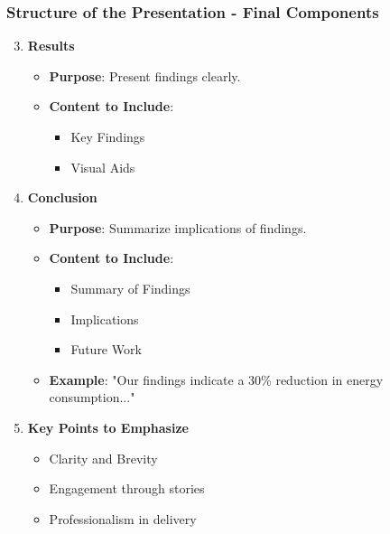 \documentclass[aspectratio=169]{beamer}
\begin{document}
\begin{frame}[fragile]
    \frametitle{Structure of the Presentation - Final Components}
    \begin{enumerate}
        \setcounter{enumi}{2}
        \item \textbf{Results}
            \begin{itemize}
                \item \textbf{Purpose}: Present findings clearly.
                \item \textbf{Content to Include}:
                    \begin{itemize}
                        \item Key Findings
                        \item Visual Aids
                    \end{itemize}
            \end{itemize}

        \item \textbf{Conclusion}
            \begin{itemize}
                \item \textbf{Purpose}: Summarize implications of findings.
                \item \textbf{Content to Include}:
                    \begin{itemize}
                        \item Summary of Findings
                        \item Implications
                        \item Future Work
                    \end{itemize}
                \item \textbf{Example}: "Our findings indicate a 30\% reduction in energy consumption..."
            \end{itemize}
        
        \item \textbf{Key Points to Emphasize}
            \begin{itemize}
                \item Clarity and Brevity
                \item Engagement through stories
                \item Professionalism in delivery
            \end{itemize}
    \end{enumerate}
\end{frame}
\end{document}
